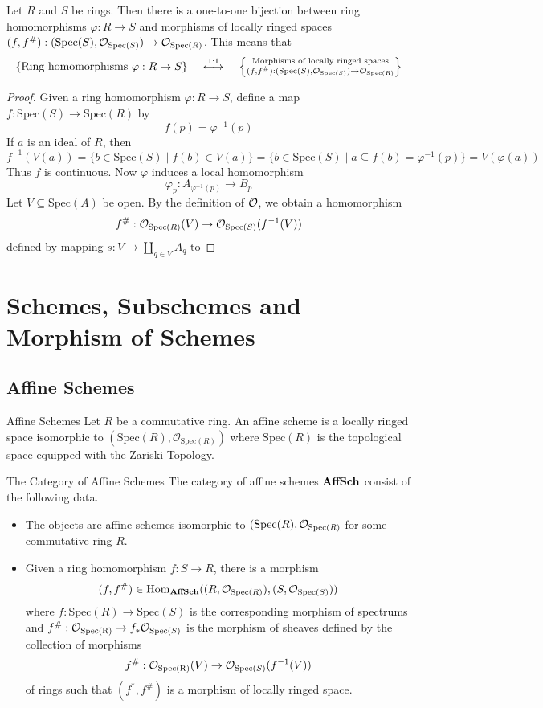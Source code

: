 \documentclass[a4paper]{article}
\begin{document}
\begin{prp}{}{} Let $R$ and $S$ be rings. Then there is a one-to-one bijection between ring homomorphisms $\varphi:R\to S$ and morphisms of locally ringed spaces $(f,f^\#):(\text{Spec}(S),\mathcal{O}_{\text{Spec}(S)})\to\mathcal{O}_{\text{Spec}(R)}$. This means that $$\left\{\text{Ring homomorphisms }\varphi:R\to S\right\}\;\;\;\;\overset{1:1}{\longleftrightarrow}\;\;\;\;\left\{\substack{\text{Morphisms of locally ringed spaces}\\(f,f^\#):(\text{Spec}(S),\mathcal{O}_{\text{Spec}(S)})\to\mathcal{O}_{\text{Spec}(R)}}\right\}$$ \tcbline
\begin{proof}
Given a ring homomorphism $\varphi:R\to S$, define a map $f:\text{Spec}(S)\to\text{Spec}(R)$ by $$f(p)=\varphi^{-1}(p)$$ If $a$ is an ideal of $R$, then $$f^{-1}(V(a))=\{b\in\text{Spec}(S)\;|\;f(b)\in V(a)\}=\{b\in\text{Spec}(S)\;|\;a\subseteq f(b)=\varphi^{-1}(p)\}=V(\varphi(a))$$ Thus $f$ is continuous. Now $\varphi$ induces a local homomorphism $$\varphi_p:A_{\varphi^{-1}(p)}\to B_p$$ Let $V\subseteq\text{Spec}(A)$ be open. By the definition of $\mathcal{O}$, we obtain a homomorphism $$f^\#:\mathcal{O}_{\text{Spec}(R)}(V)\to\mathcal{O}_{\text{Spec}(S)}(f^{-1}(V))$$ defined by mapping $s:V\to\coprod_{q\in V}A_q$ to 
\end{proof}
\end{prp}

\pagebreak
\section{Schemes, Subschemes and Morphism of Schemes}
\subsection{Affine Schemes}
\begin{defn}{Affine Schemes}{} Let $R$ be a commutative ring. An affine scheme is a locally ringed space isomorphic to $(\text{Spec}(R),\mathcal{O}_{\text{Spec}(R)})$ where $\text{Spec}(R)$ is the topological space equipped with the Zariski Topology. 
\end{defn}

\begin{defn}{The Category of Affine Schemes}{} The category of affine schemes $\bold{AffSch}$ consist of the following data. 
\begin{itemize}
\item The objects are affine schemes isomorphic to $(\text{Spec}(R),\mathcal{O}_{\text{Spec}(R)}$ for some commutative ring $R$. 
\item Given a ring homomorphism $f:S\to R$, there is a morphism $$(f,f^\#)\in\operatorname{Hom}_{\bold{AffSch}}((R,\mathcal{O}_{\text{Spec}(R)}),(S,\mathcal{O}_{\text{Spec}(S)}))$$ where $f:\text{Spec}(R)\to\text{Spec}(S)$ is the corresponding morphism of spectrums and  $f^\#:\mathcal{O}_\text{Spec(R)}\to f_\ast\mathcal{O}_{\text{Spec}(S)}$ is the morphism of sheaves defined by the collection of morphisms $$f^\#:\mathcal{O}_\text{Spec(R)}(V)\to\mathcal{O}_{\text{Spec}(S)}(f^{-1}(V))$$ of rings such that $(f^\ast,f^\#)$ is a morphism of locally ringed space. 
\end{itemize}
\end{defn}
\end{document}
